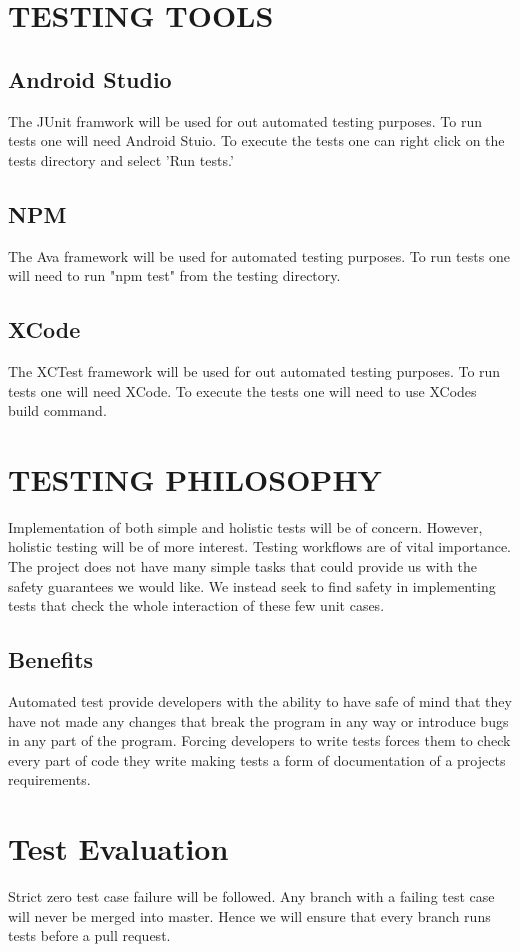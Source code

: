 \documentclass[12pt]{article}
\begin{document}
  
  \section{TESTING TOOLS}
  \subsection{Android Studio}
  The JUnit framwork will be used for out automated testing purposes. To run tests one will need Android Stuio. To execute the tests one can right click on the tests directory and select 'Run tests.'
  \subsection{NPM}
  The Ava framework will be used for automated testing purposes. To run tests one will need to run "npm test" from the testing directory.
  \subsection{XCode}
  The XCTest framework will be used for out automated testing purposes. To run tests one will need XCode. To execute the tests one will need to use XCodes build command.
  
  \section{TESTING PHILOSOPHY}
  Implementation of both simple and holistic tests will be of concern. However, holistic testing will be of more interest. Testing workflows are of vital importance. The project does not have many simple tasks that could provide us with the safety guarantees we would like. We instead seek to find safety in implementing tests that check the whole interaction of these few unit cases.
  
  \subsection{Benefits}
  Automated test provide developers with the ability to have safe of mind that they have not made any changes that break the program in any way or introduce bugs in any part of the program.
  Forcing developers to write tests forces them to check every part of code they write making tests a form of documentation of a projects requirements.
  
  \section{Test Evaluation}
  Strict zero test case failure will be followed. Any branch with a failing test case will never be merged into master. Hence we will ensure that every branch runs tests before a pull request.
  
\end{document}
